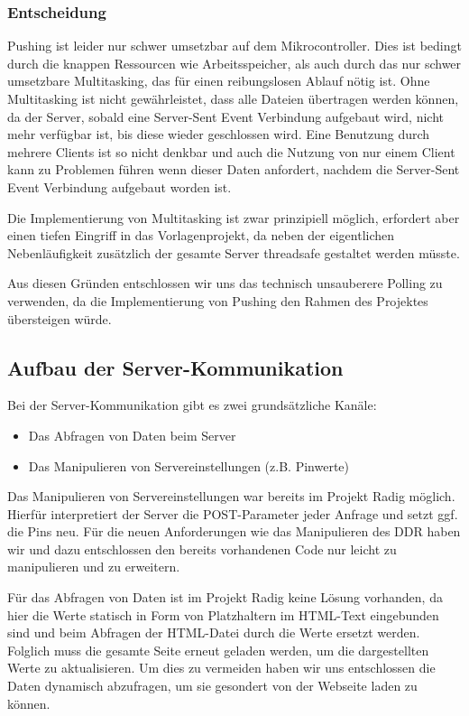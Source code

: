 \subsubsection{Entscheidung}
Pushing ist leider nur schwer umsetzbar auf dem Mikrocontroller. Dies ist
bedingt durch die knappen Ressourcen wie Arbeitsspeicher, als auch durch das nur
schwer umsetzbare Multitasking, das für einen reibungslosen Ablauf nötig ist. Ohne Multitasking
ist nicht gewährleistet, dass alle Dateien übertragen werden können, da der
Server, sobald eine Server-Sent Event Verbindung aufgebaut wird, nicht mehr
verfügbar ist, bis diese wieder geschlossen wird. Eine Benutzung durch mehrere
Clients ist so nicht denkbar und auch die Nutzung von nur einem Client kann zu
Problemen führen wenn dieser Daten anfordert, nachdem die Server-Sent Event
Verbindung aufgebaut worden ist.

Die Implementierung von Multitasking ist zwar prinzipiell möglich, erfordert
aber einen tiefen Eingriff in das Vorlagenprojekt, da neben der eigentlichen
Nebenläufigkeit zusätzlich der gesamte Server threadsafe gestaltet werden
müsste.

Aus diesen Gründen entschlossen wir uns das technisch unsauberere Polling zu
verwenden, da die Implementierung von Pushing den Rahmen des Projektes
übersteigen würde.

\subsection{Aufbau der Server-Kommunikation}

Bei der Server-Kommunikation gibt es zwei grundsätzliche Kanäle:
\begin{itemize}
  \item Das Abfragen von Daten beim Server
  \item Das Manipulieren von Servereinstellungen (z.B. Pinwerte)
\end{itemize}
Das Manipulieren von Servereinstellungen war bereits im Projekt Radig möglich.
Hierfür interpretiert der Server die POST-Parameter jeder Anfrage und setzt ggf.
die Pins neu. Für die neuen Anforderungen wie das Manipulieren des DDR haben
wir und dazu entschlossen den bereits vorhandenen Code nur leicht zu
manipulieren und zu erweitern.

Für das Abfragen von Daten ist im Projekt Radig keine Lösung vorhanden, da hier
die Werte statisch in Form von Platzhaltern im HTML-Text eingebunden sind und
beim Abfragen der HTML-Datei durch die Werte ersetzt werden. Folglich muss die
gesamte Seite erneut geladen werden, um die dargestellten Werte zu
aktualisieren. Um dies zu vermeiden haben wir uns entschlossen die Daten
dynamisch abzufragen, um sie gesondert von der Webseite laden zu können.

